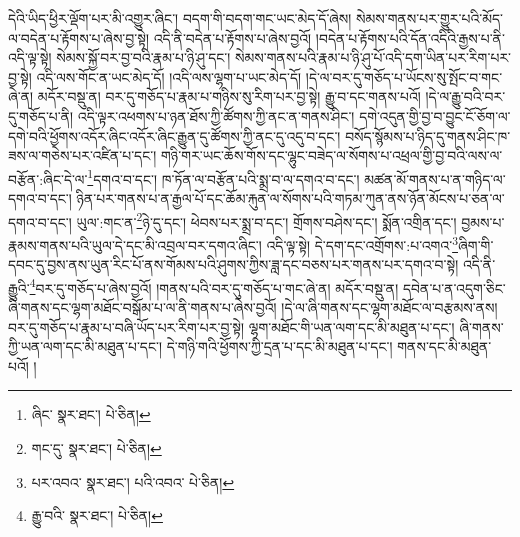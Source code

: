 དེའི་ཡིད་ཕྱིར་ལྡོག་པར་མི་འགྱུར་ཞིང་། བདག་གི་བདག་གང་ཡང་མེད་དོ་ཞེས། སེམས་གནས་པར་གྱུར་པའི་མོད་ལ་བདེན་པ་རྟོགས་པ་ཞེས་བྱ་སྟེ། འདི་ནི་བདེན་པ་རྟོགས་པ་ཞེས་བྱའོ། །བདེན་པ་རྟོགས་པའི་དོན་འདིའི་རྒྱས་པ་ནི་འདི་ལྟ་སྟེ། སེམས་སྐྱོ་བར་བྱ་བའི་རྣམ་པ་ཉི་ཤུ་དང་། སེམས་གནས་པའི་རྣམ་པ་ཉི་ཤུ་པོ་འདི་དག་ཡིན་པར་རིག་པར་བྱ་སྟེ། འདི་ལས་གོང་ན་ཡང་མེད་དོ། །འདི་ལས་ལྷག་པ་ཡང་མེད་དོ། །དེ་ལ་བར་དུ་གཅོད་པ་ཡོངས་སུ་སྤོང་བ་གང་ཞེ་ན། མདོར་བསྡུ་ན། བར་དུ་གཅོད་པ་རྣམ་པ་གཉིས་སུ་རིག་པར་བྱ་སྟེ། རྒྱུ་བ་དང་གནས་པའོ། །དེ་ལ་རྒྱུ་བའི་བར་དུ་གཅོད་པ་ནི། འདི་ལྟར་འཕགས་པ་ཉན་ཐོས་ཀྱི་ཚོགས་ཀྱི་ནང་ན་གནས་ཤིང་། དགེ་འདུན་གྱི་བྱ་བ་བྱུང་ངོ་ཅོག་ལ་དགེ་བའི་ཕྱོགས་འདོར་ཞིང་འདོར་ཞིང་རྒྱུན་དུ་ཚོགས་ཀྱི་ནང་དུ་འདུ་བ་དང་། བསོད་སྙོམས་པ་ཉིད་དུ་གནས་ཤིང་ཁ་ཟས་ལ་གཅེས་པར་འཛིན་པ་དང་། གཉི་གར་ཡང་ཆོས་གོས་དང་ལྷུང་བཟེད་ལ་སོགས་པ་འཕྲལ་གྱི་བྱ་བའི་ལས་ལ་བརྩོན་:ཞིང་དེ་ལ་\footnote{ཞིང་  སྣར་ཐང་།  པེ་ཅིན། }དགའ་བ་དང་། ཁ་ཏོན་ལ་བརྩོན་པའི་སྨྲ་བ་ལ་དགའ་བ་དང་། མཚན་མོ་གནས་པ་ན་གཉིད་ལ་དགའ་བ་དང་། ཉིན་པར་གནས་པ་ན་རྒྱལ་པོ་དང་ཆོམ་རྐུན་ལ་སོགས་པའི་གཏམ་ཀུན་ནས་ཉོན་མོངས་པ་ཅན་ལ་དགའ་བ་དང་། ཡུལ་:གང་ན་\footnote{གང་དུ་  སྣར་ཐང་།  པེ་ཅིན། }ཉེ་དུ་དང་། ཕེབས་པར་སྨྲ་བ་དང་། གྲོགས་བཤེས་དང་། སྨོན་འགྲིན་དང་། བྱམས་པ་རྣམས་གནས་པའི་ཡུལ་དེ་དང་མི་འབྲལ་བར་དགའ་ཞིང་། འདི་ལྟ་སྟེ། དེ་དག་དང་འགྲོགས་:པ་འགའ་\footnote{པར་འབའ་  སྣར་ཐང་། པའི་འབའ་  པེ་ཅིན། }ཞིག་གི་དབང་དུ་བྱས་ནས་ཡུན་རིང་པོ་ནས་གོམས་པའི་ཤུགས་ཀྱིས་ཟླ་དང་བཅས་པར་གནས་པར་དགའ་བ་སྟེ། འདི་ནི་རྒྱུའི་\footnote{རྒྱུ་བའི་  སྣར་ཐང་།  པེ་ཅིན། }བར་དུ་གཅོད་པ་ཞེས་བྱའོ། །གནས་པའི་བར་དུ་གཅོད་པ་གང་ཞེ་ན། མདོར་བསྡུ་ན། དབེན་པ་ན་འདུག་ཅིང་ཞི་གནས་དང་ལྷག་མཐོང་བསྒོམ་པ་ལ་ནི་གནས་པ་ཞེས་བྱའོ། །དེ་ལ་ཞི་གནས་དང་ལྷག་མཐོང་ལ་བརྩམས་ནས། བར་དུ་གཅོད་པ་རྣམ་པ་བཞི་ཡོད་པར་རིག་པར་བྱ་སྟེ། ལྷག་མཐོང་གི་ཡན་ལག་དང་མི་མཐུན་པ་དང་། ཞི་གནས་ཀྱི་ཡན་ལག་དང་མི་མཐུན་པ་དང་། དེ་གཉི་གའི་ཕྱོགས་ཀྱི་དྲན་པ་དང་མི་མཐུན་པ་དང་། གནས་དང་མི་མཐུན་པའོ། །
